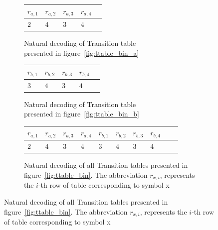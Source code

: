 \documentclass{mini}
\begin{document}
%
%
\begin{figure}[H]
    \begin{center}
        
        \setlength{\tabcolsep}{1pt}
        \renewcommand{\arraystretch}{1.9}
        
        \begin{subfigure}{.5\textwidth}
            \centering
            
            \begin{tabular}{|P{.9cm} | P{0.9cm} | P{0.9cm} | P{0.9cm} | P{0.9cm} |}
                \hline
                $r_{a,1}$  & $r_{a,2}$ & $r_{a,3}$ & $r_{a,4}$ \\
                \hline
                \hline
                $2$  & $4$ & $3$ & $4$ \\
                \hline	
            \end{tabular}
            \caption{Natural decoding of Transition table \\presented in figure~\ref{fig:ttable_bin_a}}
            \label{fig:encoding_a}
        \end{subfigure}%
        \begin{subfigure}{.5\textwidth}
            \centering
            
            \begin{tabular}{|P{.9cm} | P{0.9cm} | P{0.9cm} | P{0.9cm} | P{0.9cm} |}
                \hline
                $r_{b,1}$  & $r_{b,2}$ & $r_{b,3}$ & $r_{b,4}$ \\
                \hline
                \hline
                $3$  & $4$ & $3$ & $4$ \\
                \hline	
            \end{tabular}
            \caption{Natural decoding of Transition table \\presented in figure~\ref{fig:ttable_bin_b}}
            \label{fig:encoding_b}
        \end{subfigure}
        
        \begin{subfigure}{.5\textwidth}
            \centering
            
            \begin{tabular}{|P{.9cm} | P{0.9cm} | P{0.9cm} | P{0.9cm} | P{0.9cm} |P{.9cm} | P{0.9cm} | P{0.9cm} | P{0.9cm} | P{0.9cm} |}
                \hline
                $r_{a,1}$  & $r_{a,2}$ & $r_{a,3}$ & $r_{a,4}$ & $r_{b,1}$  & $r_{b,2}$ & $r_{b,3}$ & $r_{b,4}$ \\
                \hline
                \hline
                $2$  & $4$ & $3$ & $4$ & $3$  & $4$ & $3$ & $4$ \\
                \hline	
            \end{tabular}
            \caption{Natural decoding of all Transition tables presented in figure~\ref{fig:ttable_bin}. The abbreviation $r_{x,i}$, represents the $i$-th row of table corresponding to symbol x}
            \label{fig:encoding_both}
        \end{subfigure}
        

\end{center}
\end{figure}
\end{document}
